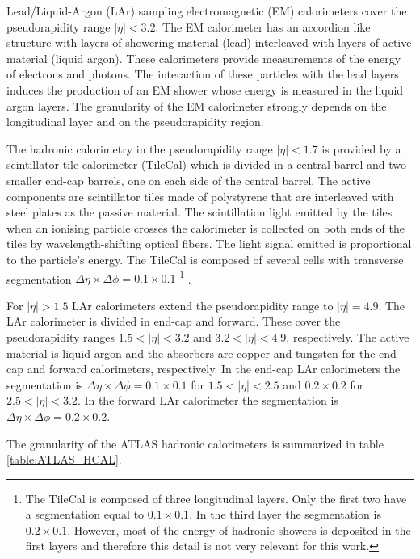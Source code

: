 Lead/Liquid-Argon (LAr) sampling electromagnetic (EM) calorimeters cover the pseudorapidity range $|\eta|<3.2$. The EM calorimeter has an accordion like structure with layers of showering material (lead) interleaved with layers of active material (liquid argon). These calorimeters provide measurements of the energy of electrons and photons. The interaction of these particles with the lead layers induces the production of an EM shower whose energy  is measured in the liquid argon layers. The granularity of the EM calorimeter strongly depends on the longitudinal layer and on the pseudorapidity region. 

The hadronic calorimetry in the pseudorapidity range $|\eta|<1.7$ is provided by a scintillator-tile calorimeter (TileCal) which is divided in a central barrel and two smaller end-cap barrels, one on each side of the central barrel. The active components are scintillator tiles made of polystyrene that are interleaved with steel plates as the passive material. The scintillation light emitted by the tiles when an ionising particle crosses the calorimeter is collected on both ends of the tiles by wavelength-shifting optical fibers. The light signal emitted is proportional to the particle's energy. The TileCal is composed of several cells with transverse segmentation $\Delta\eta\times\Delta\phi=0.1\times0.1$ \footnote{The TileCal is composed of three longitudinal layers. Only the first two have a segmentation equal to $0.1\times 0.1$. In the third layer the segmentation is $0.2\times 0.1$. However, most of the energy of hadronic showers is deposited in the first layers and therefore this detail is not very relevant for this work.} \cite{TileCalTech}. 

For $|\eta|>1.5$ LAr calorimeters extend the pseudorapidity range to $|\eta|=4.9$. The LAr calorimeter is divided in end-cap and forward. These cover the pseudorapidity ranges $1.5<|\eta|<3.2$ and $3.2<|\eta|<4.9$, respectively. The active material is liquid-argon and the absorbers are copper and tungsten for the end-cap and forward calorimeters, respectively. In the end-cap LAr calorimeters the segmentation is $\Delta\eta\times\Delta\phi= 0.1\times0.1$ for $1.5<|\eta|<2.5$ and $0.2\times0.2$ for $2.5<|\eta|<3.2$. In the forward LAr calorimeter the segmentation is $\Delta\eta\times\Delta\phi= 0.2\times0.2$. 

The granularity of the ATLAS hadronic calorimeters is summarized in table \ref{table:ATLAS_HCAL}.

\renewcommand{\arraystretch}{1.2}

